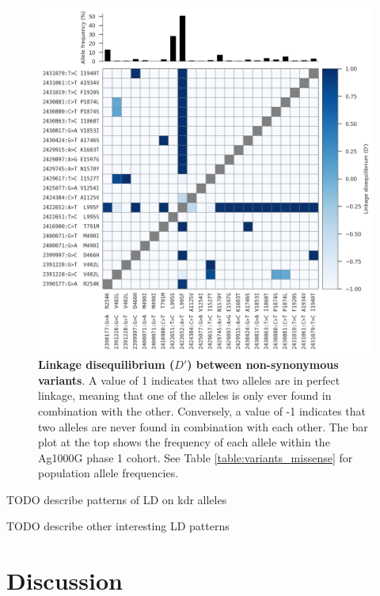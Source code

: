 \documentclass[a4paper,11pt,abstracton,hidelinks]{scrartcl}
\begin{document}
%
\begin{figure}[!t]

  \centering

  \includegraphics[width=\linewidth]{artwork/fig_ld.png}

  \caption{\textbf{Linkage disequilibrium ($D'$) between non-synonymous variants}. A value of 1 indicates that two alleles are in perfect linkage, meaning that one of the alleles is only ever found in combination with the other. Conversely, a value of -1 indicates that two alleles are never found in combination with each other. The bar plot at the top shows the frequency of each allele within the Ag1000G phase 1 cohort. See Table \ref{table:variants_missense} for population allele frequencies.}

  \label{fig:ld}

\end{figure}


TODO describe patterns of LD on kdr alleles


TODO describe other interesting LD patterns


\section*{Discussion}
\end{document}
